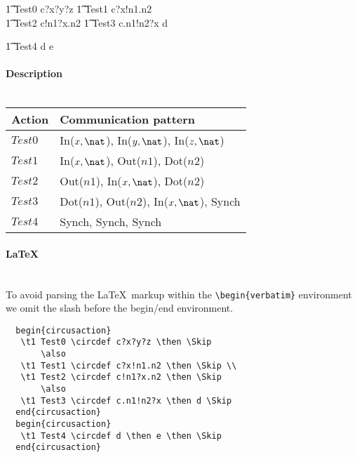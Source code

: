 \documentclass{article}
\begin{document}
\begin{circusaction}
   \t1 Test0 \circdef c?x?y?z \then \Skip
   \also
   \t1 Test1 \circdef c?x!n1.n2 \then \Skip \\
   \t1 Test2 \circdef c!n1?x.n2 \then \Skip
   \also
   \t1 Test3 \circdef c.n1!n2?x \then d \then \Skip
\end{circusaction}

\begin{circusaction}
   \t1 Test4 \circdef d \then e \then \Skip
\end{circusaction}

\paragraph{Description \\ \\}

\vspace{2pt}
\begin{tabular}{l|l}
   \hline
   Action   & Communication pattern \\
   \hline
   $Test0$  & In($x, \nat$), In($y, \nat$), In($z, \nat$) \\
   \hline
   $Test1$  & In($x, \nat$), Out($n1$), Dot($n2$) \\
   \hline
   $Test2$  & Out($n1$), In($x, \nat$), Dot($n2$) \\
   \hline
   $Test3$  & Dot($n1$), Out($n2$), In($x, \nat$), Synch \\
   \hline
   $Test4$  & Synch, Synch, Synch \\
   \hline
\end{tabular}

\paragraph{\LaTeX\\ \\}

\noindent To avoid parsing the \LaTeX\ markup within the \verb'\begin{verbatim}'
environment we omit the slash before the begin/end environment.

\begin{verbatim}
  begin{circusaction}
   \t1 Test0 \circdef c?x?y?z \then \Skip
       \also
   \t1 Test1 \circdef c?x!n1.n2 \then \Skip \\
   \t1 Test2 \circdef c!n1?x.n2 \then \Skip
       \also
   \t1 Test3 \circdef c.n1!n2?x \then d \Skip
  end{circusaction}
  begin{circusaction}
   \t1 Test4 \circdef d \then e \then \Skip
  end{circusaction}
\end{verbatim}
\end{document}
